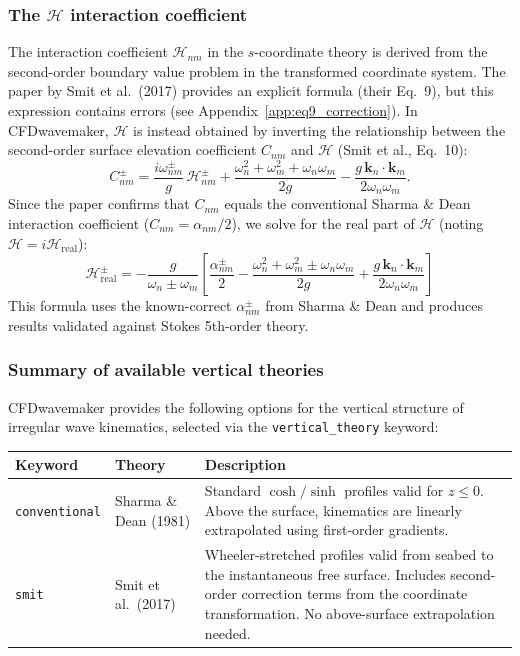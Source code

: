\subsubsection{The $\mathscr{H}$ interaction coefficient}\label{sec:H_coeff}

The interaction coefficient $\mathscr{H}_{nm}$ in the $s$-coordinate theory is derived from the second-order boundary value problem in the transformed coordinate system. The paper by Smit et al.\ (2017) provides an explicit formula (their Eq.~9), but this expression contains errors (see Appendix~\ref{app:eq9_correction}). In CFDwavemaker, $\mathscr{H}$ is instead obtained by inverting the relationship between the second-order surface elevation coefficient $C_{nm}$ and $\mathscr{H}$ (Smit et al., Eq.~10):
\begin{equation}
    C_{nm}^\pm = \frac{i\omega_{nm}^\pm}{g}\,\mathscr{H}_{nm}^\pm + \frac{\omega_n^2 + \omega_m^2 + \omega_n\omega_m}{2g} - \frac{g\,\mathbf{k}_n \cdot \mathbf{k}_m}{2\omega_n\omega_m}.
\end{equation}
Since the paper confirms that $C_{nm}$ equals the conventional Sharma \& Dean interaction coefficient ($C_{nm} = \alpha_{nm}/2$), we solve for the real part of $\mathscr{H}$ (noting $\mathscr{H} = i\mathscr{H}_\mathrm{real}$):
\begin{equation}\label{eq:H_inversion}
    \boxed{\mathscr{H}_\mathrm{real}^{\pm} = -\frac{g}{\omega_n \pm \omega_m}\left[\frac{\alpha_{nm}^\pm}{2} - \frac{\omega_n^2 + \omega_m^2 \pm \omega_n\omega_m}{2g} + \frac{g\,\mathbf{k}_n\cdot\mathbf{k}_m}{2\omega_n\omega_m}\right]}
\end{equation}
This formula uses the known-correct $\alpha_{nm}^\pm$ from Sharma \& Dean and produces results validated against Stokes 5th-order theory.

\subsubsection{Summary of available vertical theories}
CFDwavemaker provides the following options for the vertical structure of irregular wave kinematics, selected via the \texttt{vertical\_theory} keyword:

\begin{table}[!htbp]
\renewcommand{\arraystretch}{1.5}
\begin{tabularx}{\textwidth}{@{}llX@{}}
\toprule
Keyword & Theory & Description \\
\midrule
\texttt{conventional} & Sharma \& Dean (1981) & Standard $\cosh/\sinh$ profiles valid for $z \leq 0$. Above the surface, kinematics are linearly extrapolated using first-order gradients. \\
\texttt{smit} & Smit et al.\ (2017) & Wheeler-stretched profiles valid from seabed to the instantaneous free surface. Includes second-order correction terms from the coordinate transformation. No above-surface extrapolation needed. \\
\bottomrule
\end{tabularx}
\end{table}

